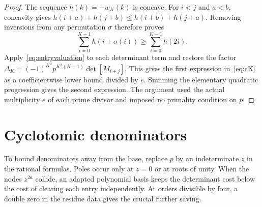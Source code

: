 \documentclass[11pt,letterpaper]{article}
\numberwithin{equation}{section}
\theoremstyle{remark}\newtheorem{remark}[theorem]{Remark}
\begin{document}
\begin{proof}
The sequence $h(k)=-w_K(k)$ is concave. For $i<j$ and $a<b$, concavity gives
$h(i+a)+h(j+b)\le h(i+b)+h(j+a)$. Removing inversions from any permutation $\sigma$ therefore proves
\begin{equation*}
 \sum_{i=0}^{K-1}h(i+\sigma(i))\ge\sum_{i=0}^{K-1}h(2i).
\end{equation*}
Apply~\eqref{eq:entryvaluation} to each determinant term and restore the factor
$\Delta_K=(-1)^{K^2}p^{K^2(K+1)}\det[M_{i+j}]$. This gives the first expression in~\eqref{eq:cK} as a coefficientwise lower bound divided by $e$. Summing the elementary quadratic progression gives the second expression. The argument used the actual multiplicity $e$ of each prime divisor and imposed no primality condition on $p$.
\end{proof}

\section{Cyclotomic denominators}
To bound denominators away from the base, replace $p$ by an indeterminate $z$ in the rational formulas. Poles occur only at $z=0$ or at roots of unity. When the nodes $z^{2a}$ collide, an adapted polynomial basis keeps the determinant cost below the cost of clearing each entry independently. At orders divisible by four, a double zero in the residue data gives the crucial further saving.
\end{document}

